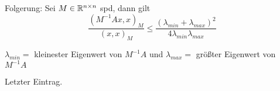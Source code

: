 Folgerung: 
Sei $M\in\mathbb{R}^{n\times n}$ spd, dann gilt 
\begin{equation}
  \frac{(M^{-1}Ax,x)_M}{(x,x)_M} \leq \frac{(\lambda_{min}+\lambda_{max})^2}{4\lambda_{min}\lambda_{max}}
  \label{}
\end{equation}

$\lambda_{min} = $ kleinester Eigenwert von $M^{-1}A$ und $\lambda_{max} = $ größter Eigenwert von $M^{-1}A$

Letzter Eintrag.
